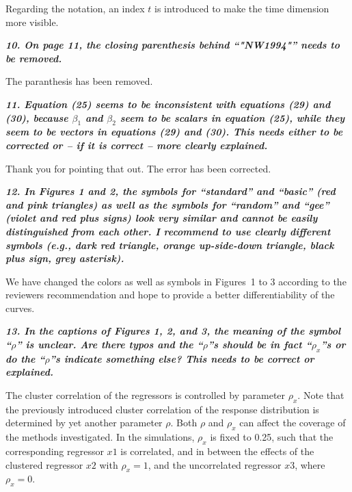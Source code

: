 \documentclass[10pt,a4paper]{article}
\begin{document}
Regarding the notation, an index $t$ is introduced to make the time dimension more visible.

\medskip

\textbf{\textit{10. On page 11, the closing parenthesis behind ``"NW1994"'' needs to be removed.}}

\medskip

The paranthesis has been removed.

\medskip

\textbf{\textit{11. Equation (25) seems to be inconsistent with equations (29) and (30), because $\beta_1$ and
$\beta_2$ seem to be scalars in equation (25), while they seem to be vectors in equations (29)
and (30). This needs either to be corrected or -- if it is correct -- more clearly explained.}}

\medskip

Thank you for pointing that out. The error has been corrected.

\medskip

\textbf{\textit{12. In Figures 1 and 2, the symbols for ``standard'' and ``basic'' (red and pink triangles)
as well as the symbols for ``random'' and ``gee'' (violet and red plus signs) look very
similar and cannot be easily distinguished from each other. I recommend to use clearly
different symbols (e.g., dark red triangle, orange up-side-down triangle, black plus sign,
grey asterisk).}}

\medskip

We have changed the colors as well as symbols in Figures~1 to 3 according to the reviewers recommendation and hope to provide a better differentiability of the curves.

\medskip

\textbf{\textit{13. In the captions of Figures 1, 2, and 3, the meaning of the symbol ``$\rho$'' is unclear. Are
there typos and the ``$\rho$''s should be in fact ``$\rho_x$''s or do the ``$\rho$''s indicate something else?
This needs to be correct or explained.}}

\medskip

The cluster correlation of the regressors is controlled by parameter $\rho_x$. Note that the previously introduced cluster correlation of the response distribution is determined by yet another parameter $\rho$. Both $\rho$ and $\rho_x$ can affect the coverage of the methods investigated. In the simulations, $\rho_x$ is fixed to 0.25, such that the corresponding regressor $x1$ is correlated, and in between the effects of the clustered regressor $x2$ with $\rho_x = 1$, and the uncorrelated regressor $x3$, where $\rho_x = 0$.
\end{document}
